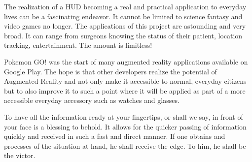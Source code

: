 The realization of a HUD becoming a real and practical application to everyday lives can be a fascinating endeavor. It cannot be limited to science fantasy and video games no longer. The applications of this project are astounding and very broad. It can range from surgeons knowing the status of their patient, location tracking, entertainment. The amount is limitless!

Pokemon GO! was the start of many augmented reality applications available on Google Play. The hope is that other developers realize the potential of Augmented Reality and not only make it accessible to normal, everyday citizens but to also improve it to such a point where it will be applied as part of a more accessible everyday accessory such as watches and glasses.

To have all the information ready at your fingertips, or shall we say, in front of your face is a blessing to behold. It allows for the quicker passing of information quickly and received in such a fast and direct manner. If one obtains and processes of the situation at hand, he shall receive the edge. To him, he shall be the victor.
